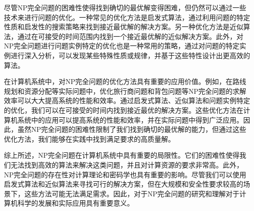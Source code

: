 \documentclass[UTF8,openany,zihao=5]{ctexbook}
\begin{document}
尽管NP完全问题的困难性使得找到确切的最优解变得困难，但仍然可以通过一些技术来进行问题的优化。一种常见的优化方法是启发式算法，通过利用问题的特定性质和启发性的搜索策略来找到接近最优解的解决方案。另一种优化方法是近似算法，通过在可接受的时间范围内找到一个接近最优解的近似解决方案。此外，对NP完全问题进行问题实例特定的优化也是一种常用的策略，通过对问题的特定实例进行深入分析，可以发现某些特殊性质或规律，并基于这些特性设计出更高效的算法。

在计算机系统中，对NP完全问题的优化方法具有重要的应用价值。例如，在路线规划和资源分配等实际问题中，优化旅行商问题和背包问题等NP完全问题的求解效率可以大大提高系统的性能和效率。通过启发式算法、近似算法和问题实例特定的优化，我们可以在可接受的时间内找到接近最优的解决方案。这些优化方法在计算机系统中的应用可以提高系统的性能和效率，并在实际问题中得到广泛应用。因此，虽然NP完全问题的困难性限制了我们找到确切的最优解的能力，但通过这些优化方法，我们能够在实践中找到满足要求的高质量解。

综上所述，NP完全问题在计算机系统中具有重要的局限性。它们的困难性使得我们无法找到高效的算法来解决这类问题，并且对计算资源的要求非常高。此外，NP完全问题的存在性对计算理论和密码学也具有重要的影响。尽管我们可以使用启发式算法和近似算法来寻找可行的解决方案，但在大规模和安全性要求较高的场景下，这些方法可能无法满足需求。因此，对于NP完全问题的研究和理解对于计算机科学的发展和实际应用具有重要意义。
\end{document}
